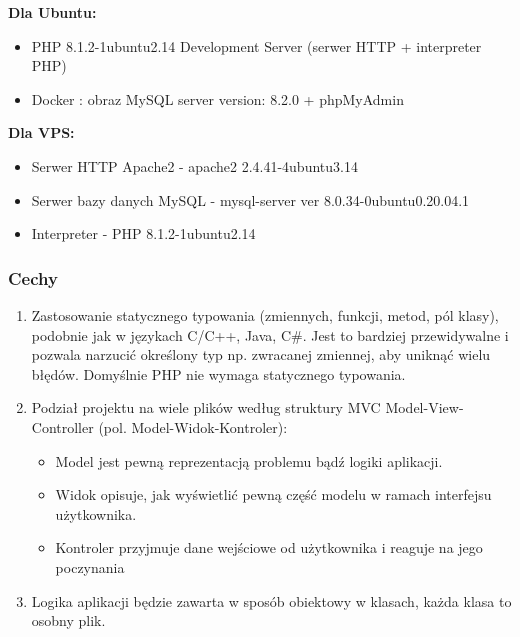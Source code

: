 \begin{flushleft}
        \textbf{Dla Ubuntu:}
        \begin{itemize}
            \item PHP 8.1.2-1ubuntu2.14 Development Server (serwer HTTP + interpreter PHP)
            \item Docker : obraz MySQL server version: 8.2.0 + phpMyAdmin
        \end{itemize}

        \textbf{Dla VPS:}
        \begin{itemize}
            \item Serwer HTTP Apache2 -  apache2 2.4.41-4ubuntu3.14 
            \item Serwer bazy danych MySQL - mysql-server  ver 8.0.34-0ubuntu0.20.04.1
            \item Interpreter - PHP 8.1.2-1ubuntu2.14 
        \end{itemize}
        
    \end{flushleft}

\pagebreak


\subsubsection{Cechy}
\begin{enumerate}
    \item Zastosowanie statycznego typowania (zmiennych, funkcji, metod, pól klasy), podobnie jak w językach C/C++, Java, C\#. Jest to bardziej przewidywalne i pozwala narzucić określony typ np. zwracanej zmiennej, aby uniknąć wielu błędów. Domyślnie PHP nie wymaga statycznego typowania.
    \item Podział projektu na wiele plików według struktury MVC Model-View-Controller (pol. Model-Widok-Kontroler):
        \begin{itemize}
            \item Model jest pewną reprezentacją problemu bądź logiki aplikacji.
            \item Widok opisuje, jak wyświetlić pewną część modelu w ramach interfejsu użytkownika. 
            \item Kontroler przyjmuje dane wejściowe od użytkownika i reaguje na jego poczynania
        \end{itemize}
    \item Logika aplikacji będzie zawarta w sposób obiektowy w klasach, każda klasa to osobny  plik.
\end{enumerate}

